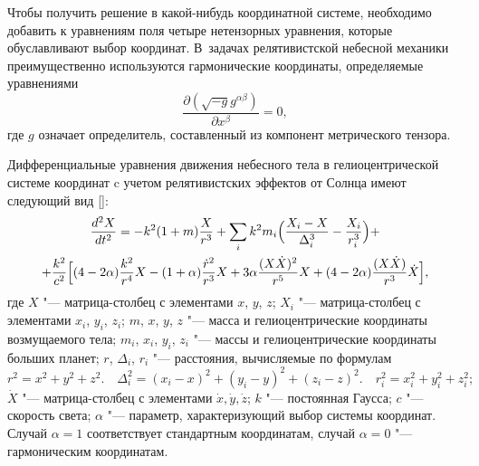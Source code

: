 Чтобы получить решение в какой-нибудь координатной системе, необходимо добавить к уравнениям поля четыре нетензорных уравнения, которые обуславливают выбор координат. 
В~задачах релятивистской небесной механики преимущественно используются гармонические координаты, определяемые уравнениями
\begin{equation}
\label{zaus:eq4}
\frac{\partial(\sqrt{-g}g^{ \alpha \beta})}{\partial  x ^\beta}=0,
\end{equation}
где $g$ означает определитель, составленный из компонент метрического тензора.

Дифференциальные уравнения движения небесного тела  в гелиоцентрической системе координат c учетом релятивистских эффектов от Солнца имеют следующий вид []:
\begin{multline}
\frac{d^2X}{dt^2}=-k^2(1+m)\frac{X}{r^3}+\sum_i{k^2m_i\Bigl(\frac{X_i-X}{\Delta^3_i}-\frac{X_i}{r^3_i}\Bigr)}+
\\
+\frac{k^2}{c^2}\Bigl[(4-2\alpha)\frac{k^2}{r^4}X- (1+\alpha)\frac{\dot{r}^2}{r^3}X+3\alpha \frac{(X\dot{X})^2}{r^5}X+ (4-2\alpha)\frac{(X\dot{X})}{r^3}\dot{X}\Bigr],
\label{zaus:eq5}
\end{multline}
где $X$ "--- матрица-столбец с элементами $x$, $y$, $z$; $X_i$ "---
матрица-столбец с элементами $x_i$, $y_i$, $z_i$; $m$, $x$, $y$, $z$ "---
масса и гелиоцентрические координаты возмущаемого тела; $m_i$, $x_i$,
$y_i$, $z_i$ "--- массы и гелиоцентрические координаты больших планет;
$r$, $\Delta_i$, $r_i$ "--- расстояния, вычисляемые по формулам
$$r^2=x^2+y^2+z^2.\quad \Delta_i^2=(x_i-x)^2+(y_i-y)^2+(z_i-z)^2.\quad 
r^2_i=x^2_i+y^2_i+z^2_i;$$ $\dot{X}$ "--- матрица-столбец с элементами $\dot{x}, \dot{y}, \dot{z}$; 
$k$ "--- постоянная Гаусса;
$c$ "--- скорость света; 
$\alpha$ "--- параметр, характеризующий выбор системы координат. 
Случай $\alpha=1$ соответствует стандартным координатам, случай  $\alpha=0$ "--- гармоническим координатам.



